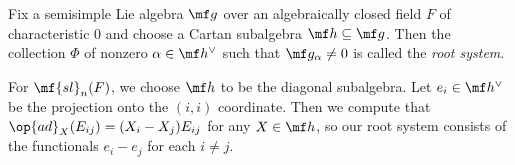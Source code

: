 \documentclass[../notes.tex]{subfiles}
\begin{document}
\begin{definition}
	Fix a semisimple Lie algebra $\mf g$ over an algebraically closed field $F$ of characteristic $0$ and choose a Cartan subalgebra $\mf h\subseteq\mf g$. Then the collection $\Phi$ of nonzero $\alpha\in\mf h^\lor$ such that $\mf g_\alpha\ne0$ is called the \textit{root system}.
\end{definition}
\begin{example}
	For $\mf{sl}_n(F)$, we choose $\mf h$ to be the diagonal subalgebra. Let $e_i\in\mf h^\lor$ be the projection onto the $(i,i)$ coordinate. Then we compute that $\op{ad}_X(E_{ij})=(X_i-X_j)E_{ij}$ for any $X\in\mf h$, so our root system consists of the functionals $e_i-e_j$ for each $i\ne j$.
\end{example}
\end{document}
